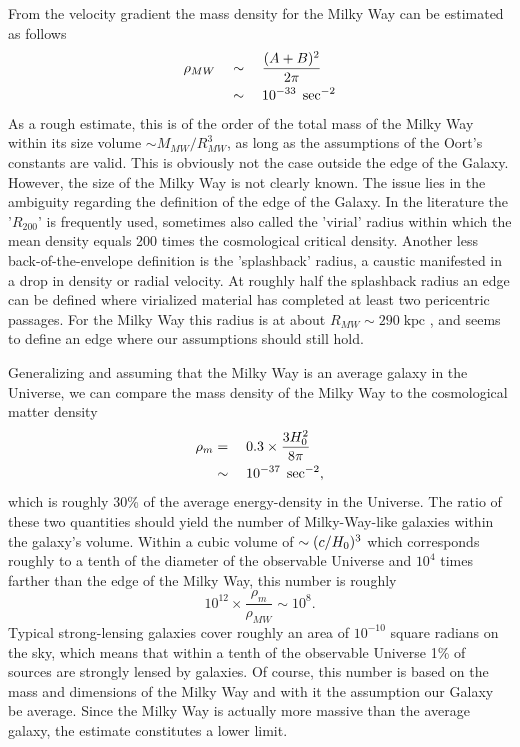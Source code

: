 From the velocity gradient the mass density for the Milky Way can be estimated
as follows
%
\begin{equation}\eqlbl{MWrho}
    \begin{aligned}
        \rho_{MW} &\quad\sim\quad \frac{(A+B)^2}{2\pi} \\
                  &\quad\sim\quad 10^{-33}\;\sec^{-2}
    \end{aligned}
\end{equation}
%
As a rough estimate, this is of the order of the total mass of the Milky Way
within its size volume $\sim M_{MW} / R_{MW}^3$, as long as the
assumptions of the Oort's constants are valid.  This is obviously not the case
outside the edge of the Galaxy.  However, the size of the Milky Way is not
clearly known.  The issue lies in the ambiguity regarding the definition of the
edge of the Galaxy.  In the literature the '$R_{200}$' is frequently used,
sometimes also called the 'virial' radius within which the mean density equals
200 times the cosmological critical density.  Another less back-of-the-envelope
definition is the 'splashback' radius, a caustic manifested in a drop in density
or radial velocity.  At roughly half the splashback radius an edge can be
defined where virialized material has completed at least two pericentric
passages.  For the Milky Way this radius is at about $R_{MW} \sim
290\;\mathrm{kpc}$ , and seems to define an edge where our
assumptions should still hold. 

Generalizing and assuming that the Milky Way is an average galaxy in the
Universe, we can compare the mass density of the Milky Way to the cosmological
matter density
%
\begin{equation}
    \begin{aligned}
        \rho_{m} &=\quad 0.3\times\frac{3H_{0}^{2}}{8\pi} \\
                 &\sim\quad 10^{-37}\;\sec^{-2},
    \end{aligned}
\end{equation}
%
which is roughly 30\% of the average energy-density in the Universe.  The ratio
of these two quantities should yield the number of Milky-Way-like galaxies
within the galaxy's volume. Within a cubic volume of $\sim (c/H_{0}{})^{3}$ which
corresponds roughly to a tenth of the diameter of the observable Universe and
$10^4$ times farther than the edge of the Milky Way, this number is roughly
%
\begin{equation*}
    10^{12}\times\frac{\rho_m}{\rho_{MW}} \sim 10^{8}.
\end{equation*}
%
Typical strong-lensing galaxies cover roughly an area of $10^{-10}$ square
radians on the sky, which means that within a tenth of the observable Universe
1\% of sources are strongly lensed by galaxies.  Of course, this number is based
on the mass and dimensions of the Milky Way and with it the assumption our
Galaxy be average.  Since the Milky Way is actually more massive than the
average galaxy, the estimate constitutes a lower limit. 


